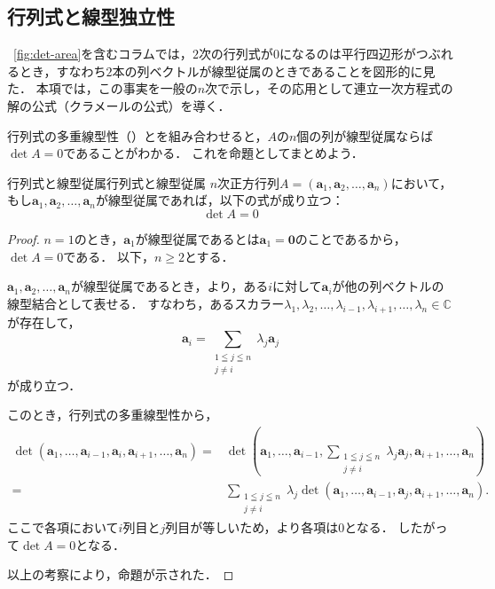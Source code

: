\subsection{行列式と線型独立性}

\figurename~\ref{fig:det-area}を含むコラムでは，$2$次の行列式が$0$になるのは平行四辺形がつぶれるとき，すなわち$2$本の列ベクトルが線型従属のときであることを図形的に見た．
本項では，この事実を一般の$n$次で示し，その応用として連立一次方程式の解の公式（クラメールの公式）を導く．

行列式の多重線型性（）とを組み合わせると，$A$の$n$個の列が線型従属ならば$\det A =0$であることがわかる．
これを命題としてまとめよう．


\begin{prop}{行列式と線型従属}{行列式と線型従属}
  $n$次正方行列$A = (\bm{a}_1, \bm{a}_2, \dots, \bm{a}_n)$において，もし$\bm{a}_1, \bm{a}_2, \dots, \bm{a}_n$が線型従属であれば，以下の式が成り立つ：
  \[
  \det A = 0
  \]
\end{prop}

\begin{tleftbar}
\begin{proof}
  $n = 1$のとき，$\bm{a}_1$が線型従属であるとは$\bm{a}_1 = \bm{0}$のことであるから，$\det A = 0$である．
  以下，$n \ge 2$とする．

  $\bm{a}_1, \bm{a}_2, \dots, \bm{a}_n$が線型従属であるとき，より，ある$i$に対して$\bm{a}_i$が他の列ベクトルの線型結合として表せる．
  すなわち，あるスカラー$\lambda_1, \lambda_2, \dots, \lambda_{i-1}, \lambda_{i+1}, \dots, \lambda_n \in \mathbb{C}$が存在して，
  \[
  \bm{a}_i = \sum_{\substack{1\leqq j\leqq n\\ j \ne i}} \lambda_j \bm{a}_j
  \]
  が成り立つ．

  このとき，行列式の多重線型性から，
  \begin{align*} 
    \det(\bm{a}_1, \dots, \bm{a}_{i-1}, \bm{a}_i, \bm{a}_{i+1}, \dots, \bm{a}_n) 
    =& \det(\bm{a}_1, \dots, \bm{a}_{i-1}, \sum_{\substack{1\leqq j\leqq n\\ j \ne i}} \lambda_j \bm{a}_j, \bm{a}_{i+1}, \dots, \bm{a}_n) \\
    =& \sum_{\substack{1\leqq j\leqq n\\ j\ne i}} \lambda_j \det(\bm{a}_1, \dots, \bm{a}_{i-1}, \bm{a}_j, \bm{a}_{i+1}, \dots, \bm{a}_n).
  \end{align*}
  ここで各項において$i$列目と$j$列目が等しいため，より各項は$0$となる．
  したがって$\det A = 0$となる．
  
  以上の考察により，命題が示された．
\end{proof}
\end{tleftbar}

